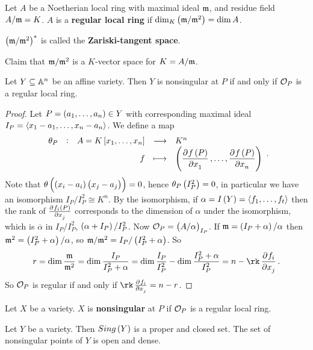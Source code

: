\begin{definition}
Let $ A $ be a Noetherian local ring with maximal ideal $ \mmm $, and residue field $ A / \mmm = K $. $ A $ is a \textbf{regular local ring} if $ \dim_K\br{\mmm / \mmm^2} = \dim A $.
\end{definition}

\begin{note*}
$ \br{\mmm / \mmm^2}^* $ is called the \textbf{Zariski-tangent space}.
\end{note*}

Claim that $ \mmm / \mmm^2 $ is a $ K $-vector space for $ K = A / \mmm $.

\begin{theorem}
Let $ Y \subseteq \AA^n $ be an affine variety. Then $ Y $ is nonsingular at $ P $ if and only if $ \OOO_P $ is a regular local ring.
\end{theorem}

\begin{proof}
Let $ P = \br{a_1, \dots, a_n} \in Y $ with corresponding maximal ideal $ I_P = \abr{x_1 - a_1, \dots, x_n - a_n} $. We define a map
$$ \function[\theta_P]{A = K\sbr{x_1, \dots, x_n}}{K^n}{f}{\br{\dpd{f\br{P}}{x_1}, \dots, \dpd{f\br{P}}{x_n}}}. $$
Note that $ \theta\br{\br{x_i - a_i}\br{x_j - a_j}} = 0 $, hence $ \theta_P\br{I_P^2} = 0 $, in particular we have an isomorphism $ I_P / I_P^2 \cong K^n $. By the isomorphism, if $ \alpha = I\br{Y} = \abr{f_1, \dots, f_t} $ then the rank of $ \tpd{f_i\br{P}}{x_j} $ corresponds to the dimension of $ \alpha $ under the isomorphism, which is $ \overline{\alpha} $ in $ I_P / I_P^2 $, $ \br{\alpha + I_P} / I_P^2 $. Now $ \OOO_P = \br{A / \alpha}_{I_P} $. If $ \mmm = \br{I_P + \alpha} / \alpha $ then $ \mmm^2 = \br{I_P^2 + \alpha} / \alpha $, so $ \mmm / \mmm^2 = I_P / \br{I_P^2 + \alpha} $. So
$$ r = \dim \dfrac{\mmm}{\mmm^2} = \dim \dfrac{I_P}{I_P^2 + \alpha} = \dim \dfrac{I_P}{I_P^2} - \dim \dfrac{I_P^2 + \alpha}{I_P^2} = n - \rk \dpd{f_i}{x_j}. $$
So $ \OOO_P $ is regular if and only if $ \rk \tpd{f_i}{x_j} = n - r $.
\end{proof}

\begin{definition}
Let $ X $ be a variety. $ X $ is \textbf{nonsingular} at $ P $ if $ \OOO_P $ is a regular local ring.
\end{definition}

\begin{theorem}
Let $ Y $ be a variety. Then $ Sing\br{Y} $ is a proper and closed set. The set of nonsingular points of $ Y $ is open and dense.
\end{theorem}


